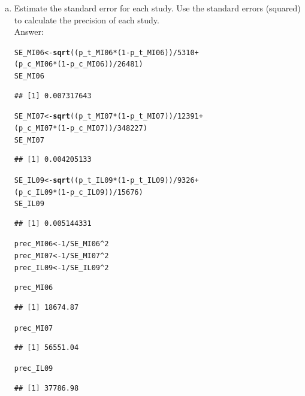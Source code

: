 \documentclass[11pt,notitlepage]{article}\usepackage[]{graphicx}\usepackage[]{color}
\makeatletter
\newcommand{\hlnum}[1]{\textcolor[rgb]{0.686,0.059,0.569}{#1}}%
\newcommand{\hlopt}[1]{\textcolor[rgb]{0,0,0}{#1}}%
\newcommand{\hlstd}[1]{\textcolor[rgb]{0.345,0.345,0.345}{#1}}%
\newcommand{\hlkwb}[1]{\textcolor[rgb]{0.69,0.353,0.396}{#1}}%
\newcommand{\hlkwd}[1]{\textcolor[rgb]{0.737,0.353,0.396}{\textbf{#1}}}%
\newenvironment{kframe}{%
 \def\at@end@of@kframe{}%
 \ifinner\ifhmode%
  \def\at@end@of@kframe{\end{minipage}}%
  \begin{minipage}{\columnwidth}%
 \fi\fi%
 \def\FrameCommand##1{\hskip\@totalleftmargin \hskip-\fboxsep
 \colorbox{shadecolor}{##1}\hskip-\fboxsep
     \hskip-\linewidth \hskip-\@totalleftmargin \hskip\columnwidth}%
 \MakeFramed {\advance\hsize-\width
   \@totalleftmargin\z@ \linewidth\hsize
   \@setminipage}}%
 {\par\unskip\endMakeFramed%
 \at@end@of@kframe}
\newenvironment{knitrout}{}{} %
\makeatother
\begin{document}
\begin{enumerate}[a)]
\item Estimate the standard error for each study. Use the standard errors (squared) to calculate the precision of each study.\\
Answer:\\
\begin{knitrout}
\color{fgcolor}\begin{kframe}
\begin{alltt}
\hlstd{SE_MI06} \hlkwb{<-} \hlkwd{sqrt}\hlstd{((p_t_MI06} \hlopt{*} \hlstd{(}\hlnum{1}\hlopt{-}\hlstd{p_t_MI06))}\hlopt{/}\hlnum{5310} \hlopt{+}
                \hlstd{(p_c_MI06} \hlopt{*} \hlstd{(}\hlnum{1}\hlopt{-}\hlstd{p_c_MI06))}\hlopt{/}\hlnum{26481}\hlstd{)}
\hlstd{SE_MI06}
\end{alltt}
\begin{verbatim}
## [1] 0.007317643
\end{verbatim}
\begin{alltt}
\hlstd{SE_MI07} \hlkwb{<-} \hlkwd{sqrt}\hlstd{((p_t_MI07} \hlopt{*} \hlstd{(}\hlnum{1}\hlopt{-}\hlstd{p_t_MI07))}\hlopt{/}\hlnum{12391} \hlopt{+}
                \hlstd{(p_c_MI07} \hlopt{*} \hlstd{(}\hlnum{1}\hlopt{-}\hlstd{p_c_MI07))}\hlopt{/}\hlnum{348227}\hlstd{)}
\hlstd{SE_MI07}
\end{alltt}
\begin{verbatim}
## [1] 0.004205133
\end{verbatim}
\begin{alltt}
\hlstd{SE_IL09} \hlkwb{<-} \hlkwd{sqrt}\hlstd{((p_t_IL09} \hlopt{*} \hlstd{(}\hlnum{1}\hlopt{-}\hlstd{p_t_IL09))}\hlopt{/}\hlnum{9326} \hlopt{+}
                \hlstd{(p_c_IL09} \hlopt{*} \hlstd{(}\hlnum{1}\hlopt{-}\hlstd{p_c_IL09))}\hlopt{/}\hlnum{15676}\hlstd{)}
\hlstd{SE_IL09}
\end{alltt}
\begin{verbatim}
## [1] 0.005144331
\end{verbatim}
\begin{alltt}
\hlstd{prec_MI06} \hlkwb{<-} \hlnum{1}\hlopt{/}\hlstd{SE_MI06}\hlopt{^}\hlnum{2}
\hlstd{prec_MI07} \hlkwb{<-} \hlnum{1}\hlopt{/}\hlstd{SE_MI07}\hlopt{^}\hlnum{2}
\hlstd{prec_IL09} \hlkwb{<-} \hlnum{1}\hlopt{/}\hlstd{SE_IL09}\hlopt{^}\hlnum{2}

\hlstd{prec_MI06}
\end{alltt}
\begin{verbatim}
## [1] 18674.87
\end{verbatim}
\begin{alltt}
\hlstd{prec_MI07}
\end{alltt}
\begin{verbatim}
## [1] 56551.04
\end{verbatim}
\begin{alltt}
\hlstd{prec_IL09}
\end{alltt}
\begin{verbatim}
## [1] 37786.98
\end{verbatim}
\end{kframe}
\end{knitrout}



\end{enumerate}
\end{document}
